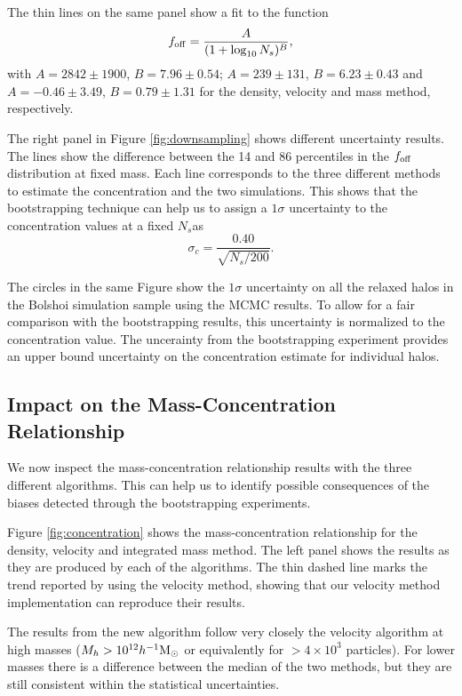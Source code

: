 \documentclass{emulateapj}
\newcommand{\hMsun}{{\ifmmode{h^{-1}{\rm {M_{\odot}}}}\else{$h^{-1}{\rm{M_{\odot}}}$}\fi}}
\begin{document}
The thin lines on the same panel show a fit to the function 
\begin{equation}
f_{\rm off} = \frac{A}{(1+\log_{10}N_s)^{B}},
\label{eq:f_off_fit}
\end{equation} 
%
with $A=2842\pm 1900$, $B=7.96\pm 0.54$; $A=239\pm 131$, $B=6.23\pm
0.43$ and $A=-0.46\pm 3.49$, $B=0.79\pm 1.31$ for the density,
velocity and mass method, respectively. 




The right panel in Figure \ref{fig:downsampling} shows different uncertainty
results.
The lines show the difference between the 14 and 86 percentiles in the
$f_{\rm off}$ distribution at fixed mass. 
Each line corresponds to the three different methods to estimate the
concentration and the two simulations.
This shows that the bootstrapping technique can help us to assign a
$1\sigma$ uncertainty to the concentration values at a fixed $N_s$as 
%
\begin{equation}
\sigma_{c} = \frac{0.40}{\sqrt{N_s/200}}.
\end{equation}
%

The circles in the same Figure show the $1\sigma$ uncertainty on all
the relaxed halos in the Bolshoi simulation sample using the MCMC
results.  
To allow for a fair comparison with the bootstrapping results, this
uncertainty is normalized to the concentration value.
The uncerainty from the bootstrapping experiment provides an upper
bound uncertainty on the concentration estimate for individual halos.  

 
 
\subsection{Impact on the Mass-Concentration Relationship}

We now inspect the mass-concentration relationship 
results with the three different algorithms.
This can help us to identify possible consequences of the 
biases detected through the bootstrapping experiments. 


Figure \ref{fig:concentration} shows the mass-concentration
relationship for the density, velocity and integrated mass method.
The left panel shows the results as they are produced by each of the
algorithms. The thin dashed line marks the trend reported by
\citep{Prada2012} using the velocity method, showing that our
velocity method implementation can reproduce their results. 

The results from the new algorithm follow very
closely the velocity algorithm at high masses ($M_h>10^{12}\hMsun$ or
equivalently for $>4\times10^3$ particles). 
For lower masses there is a difference between the median of the two
methods, but they are still consistent within the statistical
uncertainties.
\end{document}
